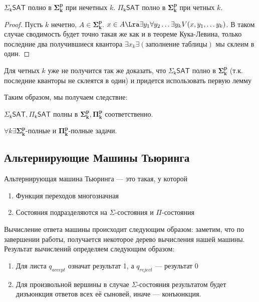\begin{lemma}
    \(\mathsf{\Sigma_kSAT}\) полно в \(\mathbf{\Sigma_k^p}\) при нечетных \(k\). \(\mathsf{\Pi_kSAT}\) полно в \(\mathbf{\Sigma_k^p}\) при четных \(k\).
\end{lemma}
\begin{proof}
    Пусть \(k\) нечетно, \(A \in \mathbf{\Sigma_k^p}\). \(x \in A \Lra \exists y_1 \forall y_2 \dots \exists y_k V(x, y_1, \dots y_k)\). В таком случае сводимость будет точно такая же как и в теореме Кука-Левина, только последние два получившиеся квантора \(\exists x_k \exists (\text{заполнение таблицы})\) мы склеим в один.
\end{proof}

\begin{note}
    Для четных \(k\) уже не получится так же доказать, что \(\mathsf{\Sigma_kSAT}\) полно в \(\mathbf{\Sigma_k^p}\) (т.к. последние кванторы не склеятся в один) и придется использовать первую лемму
\end{note}

Таким образом, мы получаем следствие:

\begin{corollary}
    \(\mathsf{\Sigma_kSAT}, \mathsf{\Pi_kSAT}\) полны в \(\mathbf{\Sigma_k^p}, \mathbf{\Pi_k^p}\) соответственно.
\end{corollary}

\begin{corollary}
    \(\forall k \exists \mathbf{\Sigma_k^p}\)-полные и \(\mathbf{\Pi_k^p}\)-полные задачи.
\end{corollary}

\subsection{Альтернирующие Машины Тьюринга}

\begin{definition}
    Альтернирующая машина Тьюринга --- это такая, у которой
    \begin{enumerate}
        \item Функция переходов многозначная
        \item Состояния подразделяются на \(\Sigma\)-состояния и \(\Pi\)-состояния
    \end{enumerate}

    Вычисление ответа машины происходит следующим образом: заметим, что по завершении работы, получается некоторое дерево вычисления нашей машины. Результат вычислений определяем следующим образом:
    \begin{enumerate}
        \item Для листа \(q_{accept}\) означат результат 1, а \(q_{reject}\) --- результат 0
        \item Для произвольной вершины в случае \(\Sigma\)-состояния результатом будет дизъюнкция ответов всех её сыновей, иначе --- конъюнкция.
    \end{enumerate}
\end{definition}


